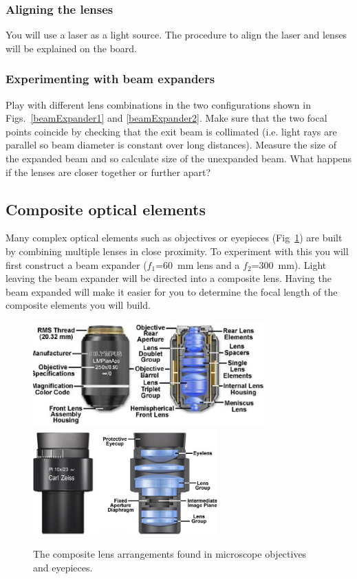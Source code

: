\documentclass[a4paper]{report}
\begin{document}
\subsubsection{Aligning the lenses}
You will use a laser as a light source. The procedure to align the
laser and lenses will be explained on the board.

\subsubsection{Experimenting with beam expanders}
Play with different lens combinations in the two configurations shown in
Figs.~\ref{beamExpander1} and \ref{beamExpander2}. Make sure that the
two focal points coincide by checking that the exit beam is
collimated (i.e. light rays are parallel so beam diameter is constant
over long distances). Measure the size of the expanded beam and so
calculate size of the unexpanded beam. What happens if the lenses are
closer together or further apart?

\clearpage
\subsection{Composite optical elements}
Many complex optical elements such as objectives or eyepieces
(Fig~\ref{composite}) are built by combining multiple lenses in close
proximity. To experiment with this you will first construct a beam
expander ($f_1$=60~mm lens and a $f_2$=300~mm). Light leaving the beam
expander will be directed into a composite lens. Having the beam
expanded will make it easier for you to determine the focal length of
the composite elements you will build.
\begin{figure}[h]
\center
\includegraphics[width=3.5in]{objectivesfigure1.eps}
\includegraphics[width=2.8in]{eyepieces5.eps}
\caption{The composite lens arrangements found in microscope
  objectives and eyepieces.}
\label{composite}
\end{figure}
\end{document}
